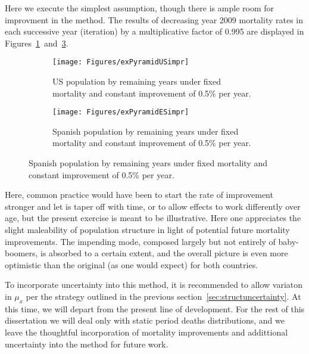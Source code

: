 Here we execute the simplest assumption, though there is ample room for
improvment in the method. The results of decreasing year 2009 mortality rates in each
successive year (iteration) by a multiplicative factor of 0.995 are displayed in
Figures~\ref{fig:exPyrUSimpr}~and~\ref{fig:exPyrESimpr}.

\begin{figure}
        \centering
        \begin{subfigure}
                \centering
                \caption{US population by remaining years under fixed
                mortality and constant improvement of 0.5\% per year.}
                \texttt{[image: Figures/exPyramidUSimpr]}
                \label{fig:exPyrUSimpr}
        \end{subfigure}
        \begin{subfigure}
                \centering
                \caption{Spanish population by remaining years under fixed
                mortality and constant improvement of 0.5\% per year.}
                \texttt{[image: Figures/exPyramidESimpr]}
                \label{fig:exPyrESimpr}
        \end{subfigure}
\end{figure}

Here, common practice would have been to start the rate of improvement stronger
and let is taper off with time, or to allow effects to work differently over
age, but the present exercise is meant to be illustrative. Here one appreciates
the slight maleability of population structure in light of potential future
mortality improvements. The impending mode, composed largely but not entirely of
baby-boomers, is absorbed to a certain extent, and the overall picture is even
more optimistic than the original (as one would expect) for both countries.

To incorporate uncertainty into this method, it is
recommended to allow variaton in $\mu_x$ per the strategy outlined in the previous
section~\ref{sec:structuncertainty}. At this time, we will depart from the
present line of development. For the rest of this dissertation we will deal only with static
period deaths distributions, and we leave the thoughtful incorporation of mortality 
improvements and addittional uncertainty into the method for future work.

\FloatBarrier